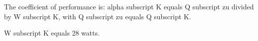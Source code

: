 The coefficient of performance is:  
alpha subscript K equals Q subscript zu divided by W subscript K, with Q subscript zu equals Q subscript K.  

W subscript K equals 28 watts.
